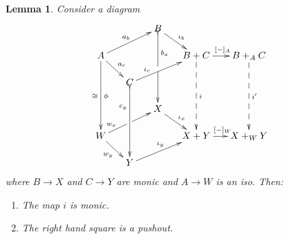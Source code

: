 \documentclass[12pt]{article}
\renewcommand{\(}{\left(}
\renewcommand{\)}{\right)}
\renewcommand{\{}{\left\lbrace}
\renewcommand{\}}{\right\rbrace}
\newtheorem*{lem}{Lemma}
\theoremstyle{remark}
\theoremstyle{definition}
\begin{document}
 \begin{lem}
Consider a diagram
 \begin{equation} \label{Diag:Lemma}
 \xymatrix@C=.2in@R=.2in{
 	{} &
 	{} &
 	{B}
 	\ar@{>->}[ddd]^(.3){b_x}|\hole
 	\ar[dr]^{\iota_b} &
 	{} &
 	{} \\
 	{A} 
 	\ar[ddd]_{\cong}^{\phi}
 	\ar[dr]^{a_c}
 	\ar[urr]^{a_b} &
 	{} &
 	{} &
 	{B+C} 
 	\ar@{-->}[ddd]^{i}
 	\ar[r]^{[-]_A} &
 	{B+_A C} 
 	\ar@{-->}[ddd]^{i'} \\
 	{} &
 	{C} 
 	\ar@{>->}[ddd]_(.3){c_y}
 	\ar[urr]^(.3){\iota_c} &
 	{} &
 	{} &
 	{} \\
 	{} &
 	{} &
 	{X} 
 	\ar[dr]^{\iota_x} &
 	{} &
 	{} \\
 	{W} 
 	\ar[dr]_{w_y}
 	\ar[urr]^(.25){w_x}|\hole &
 	{} &
 	{} &
 	{X+Y} 
 	\ar[r]^{[-]_W} &
 	{X+_WY} \\
 	{} &
 	{Y} 
 	\ar[urr]^{\iota_y} &
 	{} &
 	{} &
 	{} \\
 }
 \end{equation}
 where $B \to X$ and $C \to Y$ are monic and $A \to W$ is an iso. Then:
 \begin{enumerate}
 	\item The map $i$ is monic. \label{Lem:Claim1}
 	\item The right hand square is a pushout. \label{Lem:Claim2}
 \end{enumerate} 
\end{lem}
 
\end{document}
